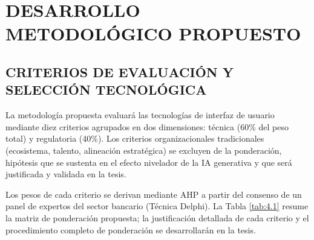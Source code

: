 \chapter{DESARROLLO METODOLÓGICO PROPUESTO}

\section{CRITERIOS DE EVALUACIÓN Y SELECCIÓN TECNOLÓGICA}

La metodología propuesta evaluará las tecnologías de interfaz de usuario
mediante diez criterios agrupados en dos dimensiones: técnica (60\% del peso
total) y regulatoria (40\%). Los criterios organizacionales tradicionales
(ecosistema, talento, alineación estratégica) se excluyen de la ponderación,
hipótesis que se sustenta en el efecto nivelador de la IA generativa y que
será justificada y validada en la tesis.

Los pesos de cada criterio se derivan mediante AHP a partir del consenso de
un panel de expertos del sector bancario (Técnica Delphi). La Tabla
\ref{tab:4.1} resume la matriz de ponderación propuesta; la justificación
detallada de cada criterio y el procedimiento completo de ponderación se
desarrollarán en la tesis.

